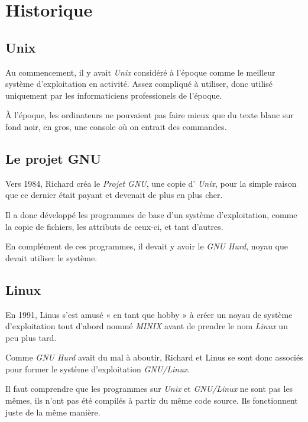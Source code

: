 \chapter{Historique}

\section{Unix}

Au commencement, il y avait \emph{Unix} considéré à l'époque comme le meilleur
système d'exploitation en activité. Assez compliqué à utiliser, donc utilisé
uniquement par les informaticiens professionels de l'époque.

À l'époque, les ordinateurs ne pouvaient pas faire mieux que du texte blanc sur
fond noir, en gros, une console où on entrait des commandes.

\section{Le projet GNU}

Vers 1984, Richard  créa le \emph{Projet GNU}, une copie d'
\emph{Unix}, pour la simple raison que ce dernier était payant et devenait de
plus en plus cher.

Il a donc développé les programmes de base d'un système d'exploitation, comme
la copie de fichiers, les attributs de ceux-ci, et tant d'autres.

En complément de ces programmes, il devait y avoir le \emph{GNU Hurd}, noyau
que devait utiliser le système.

\section{Linux}

En 1991, Linus  s'est amusé « en tant que hobby » à créer un noyau
de système d'exploitation tout d'abord nommé \emph{MINIX} avant de prendre le
nom \emph{Linux} un peu plus tard.

Comme \emph{GNU Hurd} avait du mal à aboutir, Richard  et Linus
 se sont donc associés pour former le système d'exploitation
\emph{GNU/Linux}.

Il faut comprendre que les programmes sur \emph{Unix} et \emph{GNU/Linux} ne sont
pas les mêmes, ils n'ont pas été compilés à partir du même code source. Ils
fonctionnent juste de la même manière.
